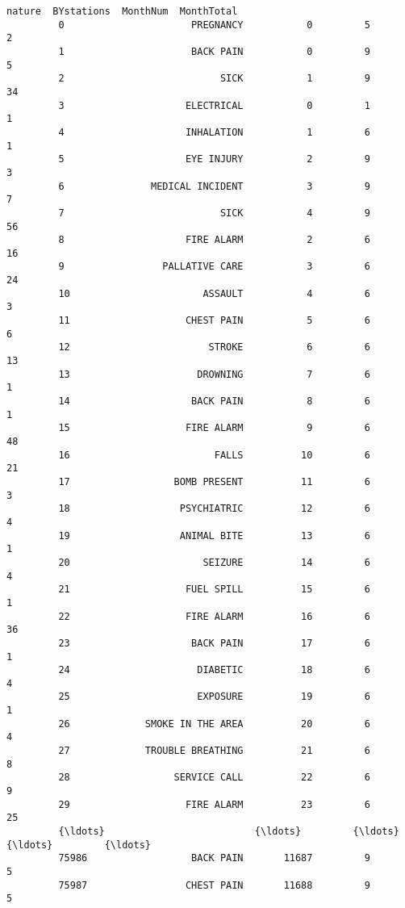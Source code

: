 \documentclass[11pt]{article}
\begin{document}
\begin{Verbatim}[commandchars=\\\{\}]
                                   nature  BYstations  MonthNum  MonthTotal  
         0                      PREGNANCY           0         5           2  
         1                      BACK PAIN           0         9           5  
         2                           SICK           1         9          34  
         3                     ELECTRICAL           0         1           1  
         4                     INHALATION           1         6           1  
         5                     EYE INJURY           2         9           3  
         6               MEDICAL INCIDENT           3         9           7  
         7                           SICK           4         9          56  
         8                     FIRE ALARM           2         6          16  
         9                 PALLATIVE CARE           3         6          24  
         10                       ASSAULT           4         6           3  
         11                    CHEST PAIN           5         6           6  
         12                        STROKE           6         6          13  
         13                      DROWNING           7         6           1  
         14                     BACK PAIN           8         6           1  
         15                    FIRE ALARM           9         6          48  
         16                         FALLS          10         6          21  
         17                  BOMB PRESENT          11         6           3  
         18                   PSYCHIATRIC          12         6           4  
         19                   ANIMAL BITE          13         6           1  
         20                       SEIZURE          14         6           4  
         21                    FUEL SPILL          15         6           1  
         22                    FIRE ALARM          16         6          36  
         23                     BACK PAIN          17         6           1  
         24                      DIABETIC          18         6           4  
         25                      EXPOSURE          19         6           1  
         26             SMOKE IN THE AREA          20         6           4  
         27             TROUBLE BREATHING          21         6           8  
         28                  SERVICE CALL          22         6           9  
         29                    FIRE ALARM          23         6          25  
         {\ldots}                          {\ldots}         {\ldots}       {\ldots}         {\ldots}  
         75986                  BACK PAIN       11687         9           5  
         75987                 CHEST PAIN       11688         9           5  

\end{Verbatim}
\end{document}
